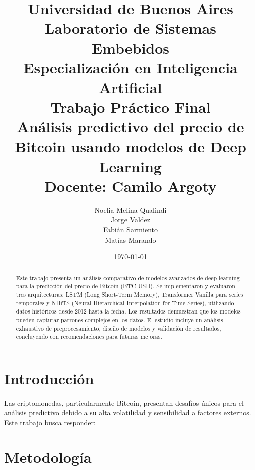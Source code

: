 \documentclass[12pt]{article}
\title{
    \vspace{-2cm}
    \normalsize \textbf{Universidad de Buenos Aires} \\
    \textbf{Laboratorio de Sistemas Embebidos} \\
    \textbf{Especialización en Inteligencia Artificial} \\
    \vspace{0.5cm}
    {Trabajo Práctico Final} \\
    \vspace{1cm}
    \Large \textbf{Análisis predictivo del precio de Bitcoin usando modelos de Deep Learning} \\
    \vspace{1cm}
    \large Docente: Camilo Argoty
    \vspace{1cm}
}
\author{
    Noelia Melina Qualindi \\
    Jorge Valdez \\
    Fabián Sarmiento \\
    Matías Marando
    \vspace{1cm}
}
\date{\today}
\begin{document}
\maketitle


\begin{abstract}
Este trabajo presenta un análisis comparativo de modelos avanzados de deep learning para la predicción del precio de Bitcoin (BTC-USD). Se implementaron y evaluaron tres arquitecturas: LSTM (Long Short-Term Memory), Transformer Vanilla para series temporales y NHiTS (Neural Hierarchical Interpolation for Time Series), utilizando datos históricos desde 2012 hasta la fecha.
Los resultados demuestran que los modelos pueden capturar patrones complejos en los datos. %
El estudio incluye un análisis exhaustivo de preprocesamiento, diseño de modelos y validación de resultados, concluyendo con recomendaciones para futuras mejoras.
\end{abstract}


\newpage
\section{Introducción}
\label{sec:intro}

Las criptomonedas, particularmente Bitcoin, presentan desafíos únicos para el análisis predictivo debido a su alta volatilidad y sensibilidad a factores externos. Este trabajo busca responder:

\begin{center}
\end{center}


\newpage
\section{Metodología}
\label{sec:metodologia}
\end{document}
